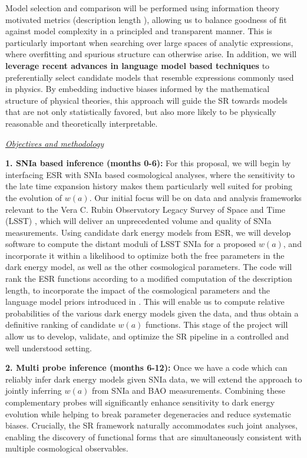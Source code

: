 \documentclass[11pt]{article}
\newcommand{\db}[1]{{\color{purple}[DJB: #1]}}
\begin{document}
Model selection and comparison will be performed using information theory motivated metrics (description length \citep{Bartlett_2024}), allowing us to balance goodness of fit against model complexity in a principled and transparent manner. This is particularly important when searching over large spaces of analytic expressions, where overfitting and spurious structure can otherwise arise. In addition, we will \textbf{leverage recent advances in language model based techniques} \citep{Bartlett_2023} to preferentially select candidate models that resemble expressions commonly used in physics. By embedding inductive biases informed by the mathematical structure of physical theories, this approach will guide the SR towards models that are not only statistically favored, but also more likely to be physically reasonable and theoretically interpretable.

\underline{\textit{Objectives and methodology}}


\textbf{1. SNIa based inference (months 0-6):} For this proposal, we will begin by interfacing ESR with SNIa based cosmological analyses, where the sensitivity to the late time expansion history makes them particularly well suited for probing the evolution of $w(a)$. Our initial focus will be on data and analysis frameworks relevant to the Vera C. Rubin Observatory Legacy Survey of Space and Time (LSST) \citep{LSST_2009}, which will deliver an unprecedented volume and quality of SNIa measurements. 
Using candidate dark energy models from ESR, we will develop software to compute the distant moduli of LSST SNIa for a proposed $w(a)$, and incorporate it within a likelihood to optimize both the free parameters in the dark energy model, as well as the other cosmological parameters.
The code will rank the ESR functions according to a modified computation of the description length, to incorporate the impact of the cosmological parameters and the language model priors introduced in \citet{Bartlett_2023}.
This will enable us to compute relative probabilities of the various dark energy models given the data, and thus obtain a definitive ranking of candidate $w(a)$ functions.
This stage of the project will allow us to develop, validate, and optimize the SR pipeline in a controlled and well understood setting.

\textbf{2. Multi probe inference (months 6-12):} Once we have a code which can reliably infer dark energy models given SNIa data, we will extend the approach to jointly inferring $w(a)$ from SNIa and BAO measurements. Combining these complementary probes will significantly enhance sensitivity to dark energy evolution while helping to break parameter degeneracies and reduce systematic biases. Crucially, the SR framework naturally accommodates such joint analyses, enabling the discovery of functional forms that are simultaneously consistent with multiple cosmological observables.
\end{document}
